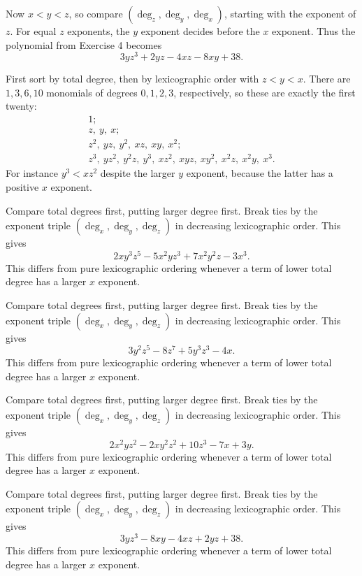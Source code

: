 Now $x<y<z$, so compare $(\deg_z,\deg_y,\deg_x)$, starting with the exponent of $z$. For equal $z$ exponents, the $y$ exponent decides before the $x$ exponent. Thus the polynomial from Exercise 4 becomes
\[3yz^3+2yz-4xz-8xy+38.\]

First sort by total degree, then by lexicographic order with $z<y<x$. There are $1,3,6,10$ monomials of degrees $0,1,2,3$, respectively, so these are exactly the first twenty:
\[
\begin{gathered}
1;\\ z,\ y,\ x;\\
z^2,\ yz,\ y^2,\ xz,\ xy,\ x^2;\\
z^3,\ yz^2,\ y^2z,\ y^3,\ xz^2,\ xyz,\ xy^2,\ x^2z,\ x^2y,\ x^3.
\end{gathered}
\]
For instance $y^3<xz^2$ despite the larger $y$ exponent, because the latter has a positive $x$ exponent.

Compare total degrees first, putting larger degree first. Break ties by the exponent triple $(\deg_x,\deg_y,\deg_z)$ in decreasing lexicographic order. This gives
\[2xy^3z^5-5x^2yz^3+7x^2y^2z-3x^3.\]
This differs from pure lexicographic ordering whenever a term of lower total degree has a larger $x$ exponent.

Compare total degrees first, putting larger degree first. Break ties by the exponent triple $(\deg_x,\deg_y,\deg_z)$ in decreasing lexicographic order. This gives
\[3y^2z^5-8z^7+5y^3z^3-4x.\]
This differs from pure lexicographic ordering whenever a term of lower total degree has a larger $x$ exponent.

Compare total degrees first, putting larger degree first. Break ties by the exponent triple $(\deg_x,\deg_y,\deg_z)$ in decreasing lexicographic order. This gives
\[2x^2yz^2-2xy^2z^2+10z^3-7x+3y.\]
This differs from pure lexicographic ordering whenever a term of lower total degree has a larger $x$ exponent.

Compare total degrees first, putting larger degree first. Break ties by the exponent triple $(\deg_x,\deg_y,\deg_z)$ in decreasing lexicographic order. This gives
\[3yz^3-8xy-4xz+2yz+38.\]
This differs from pure lexicographic ordering whenever a term of lower total degree has a larger $x$ exponent.


